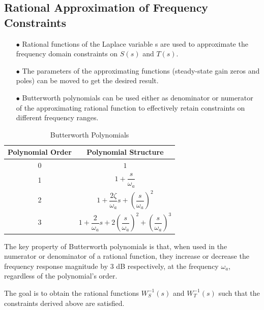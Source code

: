 \documentclass{article}
\numberwithin{equation}{subsection}
\begin{document}
	\subsection{Rational Approximation of Frequency Constraints}
	\begin{enumerate}
		\item[$\bullet$] Rational functions of the Laplace variable s are used to approximate the frequency domain constraints on $S(s)$ and $T(s)$.
		\item[$\bullet$] The parameters of the approximating functions (steady-state gain zeros and poles) can be moved to get the desired result.
		\item[$\bullet$] Butterworth polynomials can be used either as denominator or numerator of the approximating rational function to effectively retain constraints on different frequency ranges.
	\end{enumerate}
	\begin{table}[H] %
		\begin{minipage}{0.45\textwidth} %
			\centering
			\begin{tabular}{|c|c|}
				\hline
				\textbf{Polynomial Order} & \textbf{Polynomial Structure} \\ \hline
				0 & $1$ \\ \hline
				1 & $1+\dfrac{s}{\omega_a}$ \\ \hline
				2 & $1+\dfrac{2\zeta}{\omega_a}s+\left(\dfrac{s}{\omega_a}\right)^2$ \\ \hline
				3 & $1+\dfrac{2}{\omega_a}s+2\left(\dfrac{s}{\omega_a}\right)^2+\left(\dfrac{s}{\omega_a}\right)^3$ \\ \hline
			\end{tabular}
			\caption{Butterworth Polynomials}
			\label{tab:polynomial_table}
		\end{minipage}
		\hfill
		\begin{minipage}{0.5\textwidth}
			\raggedright
			\vspace{-54pt}
			The key property of Butterworth polynomials is that, when used in the numerator or denominator of a rational function, they increase or decrease the frequency response magnitude by 3 dB respectively, at the frequency $\omega_a$, regardless of the polynomial's order.
		\end{minipage}
	\end{table}
	The goal is to obtain the rational functions $W_S^{-1}(s)$ and $W_T^{-1}(s)$ such that the constraints derived above are satisfied.
\end{document}
